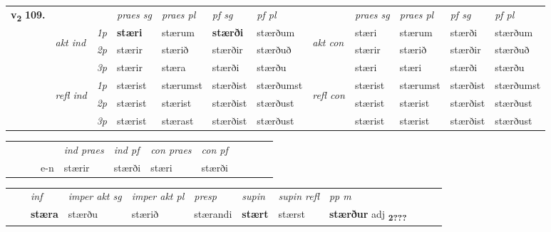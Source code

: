 \begin{tabular}{llllllllllll} \toprule
\multirow{4}{*}{{{\textbf{v{\textsubscript{2}}} \Large{\textbf{109.}}}}}  & &   &  \textit{praes sg}  & \textit{praes pl}  &\textit{ pf sg} & \textit{pf pl} &  &  \textit{praes sg}  & \textit{praes pl}  & \textit{pf sg} & \textit{pf pl } \\*
	\cmidrule{4-7} \cmidrule{9-12}
 & \multirow{3}{*}{\begin{turn}{90}\textit{akt ind}\end{turn}} & {\textit{1p}} & \textbf{stæri} & stærum    & \textbf{stærði} & stærðum & \multirow{3}{*}{\begin{turn}{90}\textit{akt con}\end{turn}} &stæri & stærum & stærði & stærðum\\*
& &  {\textit{2p}} &  stærir  & stærið   & stærðir & stærðuð & & stærir & stærið & stærðir & stærðuð \\*
& &  {\textit{3p}} & stærir & stæra   & stærði & stærðu & & stæri & stæri& stærði & stærðu  \\*
\cmidrule{4-7} \cmidrule{9-12}
 &\multirow{3}{*}{\begin{turn}{90}\textit{refl ind}\end{turn}} & {\textit{1p}} & stærist & stærumst    & stærðist & stærðumst & \multirow{3}{*}{\begin{turn}{90}\textit{refl con}\end{turn}}  &stærist & stærumst & stærðist & stærðumst\\*
 &&  {\textit{2p}} &  stærist  & stærist   & stærðist & stærðust & &stærist & stærist & stærðist & stærðust \\*
& &  {\textit{3p}} & stærist & stærast   & stærðist & stærðust & & stærist & stærist& stærðist & stærðust  \\*
\cmidrule{4-7} \cmidrule{9-12}
\end{tabular}


\begin{tabular}{llllllllllll}
 & &  & &  \textit{ind praes} & \textit{ind pf} & \textit{con praes} & \textit{con pf} \\*
&  & & e-n & stærir & stærði & stæri & stærði \\*
\cmidrule{5-9}
\end{tabular}


\begin{tabular}{llllllllllll}
 & & \textit{inf} & \textit{imper akt sg} & \textit{imper akt pl}   & \textit{presp} & \textit{supin} & \textit{supin refl} & \textit{pp m}     \\*
  & & \textbf{stæra} & stærðu  & stærið   & stærandi &  \textbf{stært} & stærst & \textbf{stærður} adj \textbf{\textsubscript{2???}} \\*
\cmidrule{1-12}
\end{tabular}



